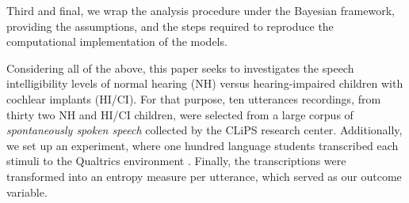Third and final, we wrap the analysis procedure under the Bayesian framework, providing the assumptions, and the steps required to reproduce the computational implementation of the models.



Considering all of the above, this paper seeks to investigates the speech intelligibility levels of normal hearing (NH) versus hearing-impaired children with cochlear implants (HI/CI). For that purpose, ten utterances recordings, from thirty two NH and HI/CI children, were selected from a large corpus of \textit{spontaneously spoken speech} collected by the CLiPS research center. Additionally, we set up an experiment, where one hundred language students transcribed each stimuli to the Qualtrics environment \cite{Qualtrics_2005}. Finally, the transcriptions were transformed into an entropy measure per utterance, which served as our outcome variable.
%
%
